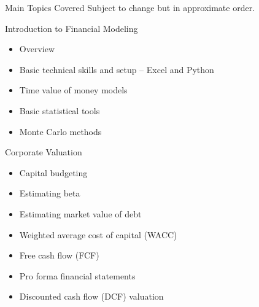 \documentclass[11pt]{resume}
\begin{document}
\vspace{0.5cm}
\begin{section}{Main Topics Covered}
Subject to change but in approximate order.
\begin{subsection}{Introduction to Financial Modeling}
\begin{itemize}
\item Overview
\item Basic technical skills and setup – Excel and Python
\item Time value of money models
\item Basic statistical tools
\item Monte Carlo methods
\end{itemize}
\end{subsection}
\begin{subsection}{Corporate Valuation}
\begin{itemize}
\item Capital budgeting
\item Estimating beta
\item Estimating market value of debt
\item Weighted average cost of capital (WACC)
\item Free cash flow (FCF)
\item Pro forma financial statements
\item Discounted cash flow (DCF) valuation
\end{itemize}
\end{subsection}
\end{section}
\end{document}
